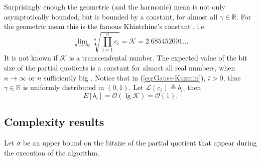 \documentclass{sig-alternate}
\def\RR{\mathbb{R}}
\newcommand{\OO}{\ensuremath{\mathcal{O}}\xspace}
\newcommand{\bitsize}[1]{\ensuremath{\mathcal{L}\left( #1 \right)}\xspace}
\begin{document}
Surprisingly enough the geometric (and the harmonic) mean is not only
asymptotically bounded, but is bounded by a constant, for almost all $\gamma \in \RR$.
For the geometric mean this is the famous Khintchine's constant
\cite{Khintchine:97}, i.e.
\begin{displaymath}
  \lim_{n \rightarrow \infty}{\sqrt[n]{ \prod_{i=1}^{n}{c_i}}} = \mathcal{K} = 2.685452001...
\end{displaymath}
It is not known if $\mathcal{K}$ is a transcendental number.
The expected value of the bit size of the partial quotients is a constant
for almost all real numbers, 
when $n \rightarrow \infty$ or $n$ sufficiently big
 \cite{Khintchine:97}.
Notice that in (\ref{eq:Gauss-Kuzmin}), $i > 0$,
thus $\gamma \in \RR$ is uniformly distributed in $(0, 1)$. 
Let $\bitsize{c_i} \triangleq b_i$, then
\begin{equation}
  E[ b_i] = \OO( \lg{\mathcal{K}}) =\OO(1).
  \label{eq:exp_b}
\end{equation}










\subsection{Complexity results}

Let $\sigma$ be an upper bound on the bitsize of the partial quotient that
appear during the execution of the algorithm.
\end{document}
